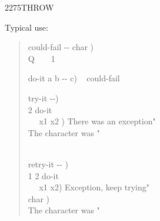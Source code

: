 \begin{worddef}{2275}{THROW}
\begin{rationale}
		Typical use:
		\begin{quote}\ttfamily
			\word{:} could-fail  -{}- char ) \\
			\tab {}  \word{[CHAR]} Q \word{=}~
				~ 1 
			\word{;}

			\word{:} do-it  a b -{}- c) ~
				 could-fail \word{;}

			\word{:} try-it  -{}-) \\
			 2 \word{[']} do-it~ ~  \\
			\tab~~  x1 x2 ) 
				  There was an exception"  \\
			\tab {}
				 The character was "   \\
			\tab {} \\
			\word{;}

			\word{;} retry-it  -{}- ) \\
			\tab {}  1 2 \word{[']} do-it ~
				 \\
			\tab~~  x1 x2) 
				 Exception, keep trying"  \\
			\tab {}  char ) \\
			\tab {} The character was "   \\
			\word{;}
		\end{quote}
	\end{rationale}

	\begin{implement} %


\end{implement}
\end{worddef}

